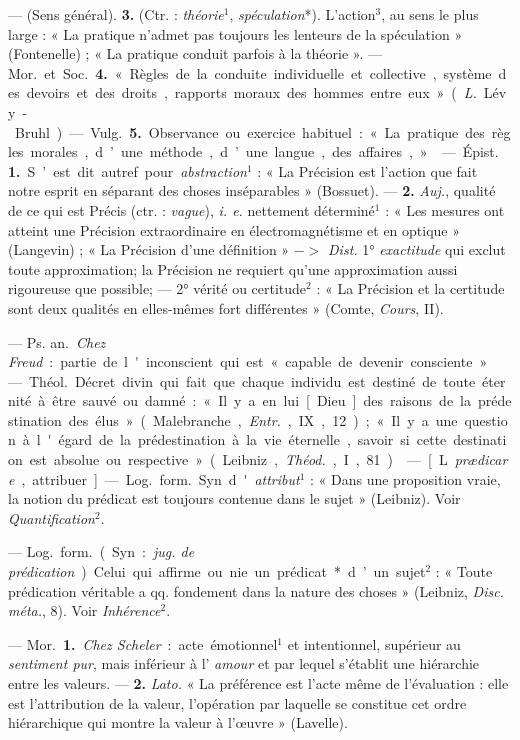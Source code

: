 \begin{itemize}[leftmargin=1cm, label=, itemsep=1pt]
 — (Sens général).  {\bf 3.} (Ctr. : {\it théorie}$^1$,
{\it spéculation}*). L'action$^3$, au sens le plus large : « La pratique
n’admet pas toujours les lenteurs de la spéculation » (Fontenelle) ; « La
pratique conduit parfois à la théorie ». — \si{Mor.} et \si{Soc.} {\bf 4.} «
Règles de la conduite individuelle et collective, système des devoirs et des
droits, rapports moraux des hommes entre eux » ({\it L.} Lévy-Bruhl). —
\si{Vulg.} {\bf 5.} Observance ou exercice habituel : « La pratique des
règles morales, d’une méthode, d’une langue, des affaires, »

 — \si{Épist.} {\bf 1.} S’est dit autref. pour
{\it abstraction}$^1$ : « La Précision est l’action que fait notre
esprit en séparant des choses inséparables » (Bossuet). — {\bf 2.}
{\it Auj.}, qualité de ce qui est Précis (ctr. : {\it vague}),
{\it i. e.} nettement déterminé$^1$ : « Les mesures ont atteint une Précision
extraordinaire en électromagnétisme et en optique » (Langevin) ; « La
Précision d'une définition » $->$ {\it Dist.} 1° {\it exactitude} qui exclut
toute approximation; la Précision ne requiert qu’une approximation aussi
rigoureuse que possible; — 2° vérité ou certitude$^2$ : « La  Précision et la
certitude sont deux qualités en elles-mêmes fort différentes » (Comte,
{\it Cours}, II).

 — \si{Ps. an.} {\it Chez Freud} : partie de l'inconscient
qui est « capable de devenir consciente ».

 — \si{Théol.} Décret divin qui fait que chaque individu
est destiné de toute éternité à être
sauvé ou damné : « Il y a en lui [Dieu] des raisons de la prédestination des
élus » (Malebranche, {\it Entr.}, IX, 12) ; « Il y a une question à l'égard
de la prédestination à la vie éternelle, savoir si cette destination est
absolue ou respective » (Leibniz, {\it Théod.}, I, 81).

 — [L. {\it prædicare}, attribuer] — \si{Log.} \si{form.} Syn.
d'{\it attribut}$^1$ : « Dans une proposition vraie, la notion du prédicat
est toujours contenue dans le sujet » (Leibniz). Voir
{\it Quantification}$^2$.

 — \si{Log.} \si{form.} (Syn. : {\it jug. de
prédication}). Celui qui affirme ou nie un prédicat* d’un sujet$^2$ : « Toute
prédication véritable a qq. fondement dans la nature des choses » (Leibniz,
{\it Disc. méta.}, 8). Voir {\it Inhérence}$^2$.

 — \si{Mor.} {\bf 1.} {\it Chez Scheler} : acte émotionnel$^1$
et intentionnel, supérieur au {\it sentiment pur}, mais inférieur à l'{\it
amour} et par lequel s'établit une hiérarchie entre les valeurs. — {\bf 2.}
{\it Lato.} « La préférence est l'acte même de l'évaluation : elle est
l’attribution de la valeur, l’opération par laquelle se constitue cet ordre
hiérarchique qui montre la valeur à l’œuvre » (Lavelle).


\end{itemize}
